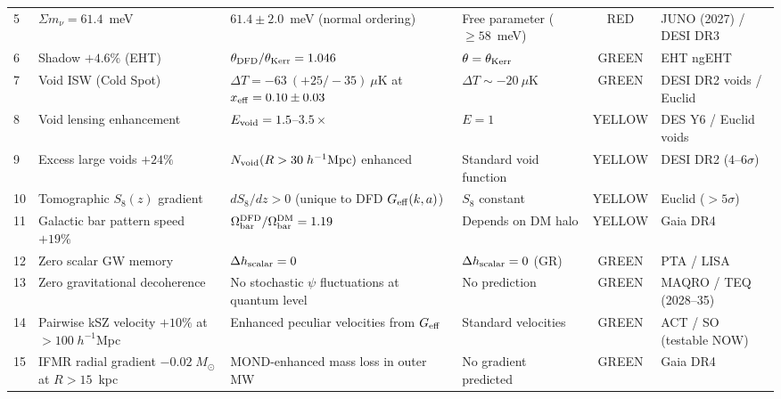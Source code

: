 \documentclass[11pt,a4paper]{article}
\newcommand{\Geff}{G_{\rm eff}}
\newcommand{\tgreen}{\cellcolor{green!25}}
\newcommand{\tyellow}{\cellcolor{yellow!35}}
\newcommand{\tred}{\cellcolor{red!25}}
\begin{document}
{\begin{longtable}{>{\raggedright}p{0.5cm}|>{\raggedright}p{3.6cm}|>{\raggedright}p{2.5cm}|>{\raggedright}p{2.5cm}|c|>{\raggedright\arraybackslash}p{2.8cm}}
5 &
  $\Sigma m_\nu = 61.4$~meV &
  $61.4 \pm 2.0$~meV (normal ordering) &
  Free parameter ($\geq 58$~meV) &
  \tred RED &
  JUNO (2027) / DESI DR3 \\

6 &
  Shadow $+4.6\%$ (EHT) &
  $\theta_{\rm DFD}/\theta_{\rm Kerr} = 1.046$ &
  $\theta = \theta_{\rm Kerr}$ &
  \tgreen GREEN &
  EHT ngEHT \\

7 &
  Void ISW (Cold Spot) &
  $\Delta T = -63~(+25/-35)~\mu$K at $x_{\rm eff} = 0.10 \pm 0.03$ &
  $\Delta T \sim -20~\mu$K &
  \tgreen GREEN &
  DESI DR2 voids / Euclid \\

8 &
  Void lensing enhancement &
  $E_{\rm void} = 1.5$--$3.5\times$ &
  $E = 1$ &
  \tyellow YELLOW &
  DES Y6 / Euclid voids \\

9 &
  Excess large voids $+24\%$ &
  $N_{\rm void}(R > 30\;h^{-1}{\rm Mpc})$ enhanced &
  Standard void function &
  \tyellow YELLOW &
  DESI DR2 ($4$--$6\sigma$) \\

10 &
  Tomographic $S_8(z)$ gradient &
  $dS_8/dz > 0$ (unique to DFD $\Geff(k,a)$) &
  $S_8$ constant &
  \tyellow YELLOW &
  Euclid ($> 5\sigma$) \\

11 &
  Galactic bar pattern speed $+19\%$ &
  $\Omega_{\rm bar}^{\rm DFD}/\Omega_{\rm bar}^{\rm DM} = 1.19$ &
  Depends on DM halo &
  \tyellow YELLOW &
  Gaia DR4 \\

12 &
  Zero scalar GW memory &
  $\Delta h_{\rm scalar} = 0$ &
  $\Delta h_{\rm scalar} = 0$ (GR) &
  \tgreen GREEN &
  PTA / LISA \\

13 &
  Zero gravitational decoherence &
  No stochastic $\psi$ fluctuations at quantum level &
  No prediction &
  \tgreen GREEN &
  MAQRO / TEQ (2028--35) \\

14 &
  Pairwise kSZ velocity $+10\%$ at $>100\;h^{-1}$Mpc &
  Enhanced peculiar velocities from $\Geff$ &
  Standard velocities &
  \tgreen GREEN &
  ACT / SO (testable NOW) \\

15 &
  IFMR radial gradient $-0.02\;M_\odot$ at $R > 15$~kpc &
  MOND-enhanced mass loss in outer MW &
  No gradient predicted &
  \tgreen GREEN &
  Gaia DR4 \\


\end{longtable}}
\end{document}
